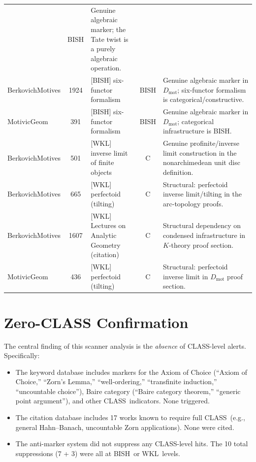 \documentclass[11pt]{article}
\newcommand{\BISH}{\textsf{BISH}}
\newcommand{\WKL}{\textsf{WKL}}
\newcommand{\CLASS}{\textsf{CLASS}}
\begin{document}
\begin{longtable}{@{}p{2.0cm}cp{2.8cm}cp{5.5cm}@{}}
  & \BISH
  & Genuine algebraic marker; the Tate twist is a purely algebraic operation. \\
%
Berkovich\-Motives & 1924
  & [\BISH] six-functor formalism
  & \BISH
  & Genuine algebraic marker in $D_\mathrm{mot}$; six-functor formalism
    is categorical/constructive. \\
%
Motivic\-Geom & 391
  & [\BISH] six-functor formalism
  & \BISH
  & Genuine algebraic marker in $D_\mathrm{mot}$; categorical infrastructure
    is \BISH. \\
\midrule
%
%
Berkovich\-Motives & 501
  & [\WKL] inverse limit of finite objects
  & C
  & Genuine profinite/inverse limit construction in the nonarchimedean
    unit disc definition. \\
%
Berkovich\-Motives & 665
  & [\WKL] perfectoid (tilting)
  & C
  & Structural: perfectoid inverse limit/tilting in the arc-topology proofs. \\
%
Berkovich\-Motives & 1607
  & [\WKL] Lectures on Analytic Geometry (citation)
  & C
  & Structural dependency on condensed infrastructure in $K$-theory
    proof section. \\
%
Motivic\-Geom & 436
  & [\WKL] perfectoid (tilting)
  & C
  & Structural: perfectoid inverse limit in $D_\mathrm{mot}$ proof section. \\
\end{longtable}

\section{Zero-CLASS Confirmation}
\label{sec:zero-class}

The central finding of this scanner analysis is the \emph{absence} of
\CLASS-level alerts.  Specifically:

\begin{itemize}
\item The keyword database includes markers for the Axiom of Choice
  (``Axiom of Choice,'' ``Zorn's Lemma,'' ``well-ordering,''
  ``transfinite induction,'' ``uncountable choice''), Baire category
  (``Baire category theorem,'' ``generic point argument''),
  and other \CLASS\ indicators.
  None triggered.

\item The citation database includes 17 works known to require full
  \CLASS\ (e.g., general Hahn--Banach, uncountable Zorn applications).
  None were cited.

\item The anti-marker system did not suppress any \CLASS-level hits.
  The 10 total suppressions (7 + 3) were all at \BISH\ or \WKL\ levels.
\end{itemize}
\end{document}
